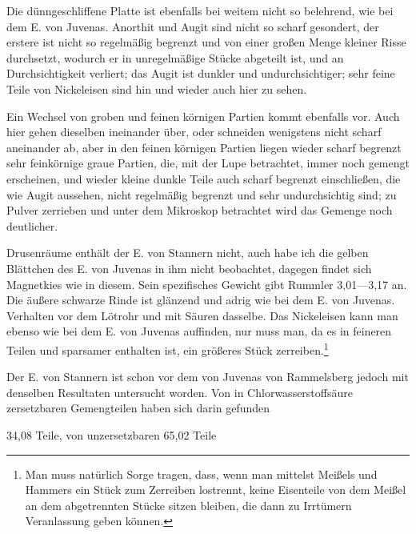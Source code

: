 \documentclass[a4paper, 11pt, oneside]{article}
\begin{document}
Die dünngeschliffene Platte ist ebenfalls bei weitem nicht so belehrend, wie bei dem E. von Juvenas. Anorthit und Augit sind nicht so scharf gesondert, der erstere ist nicht so regelmäßig begrenzt und von einer großen Menge kleiner Risse durchsetzt, wodurch er in unregelmäßige Stücke abgeteilt ist, und an Durchsichtigkeit verliert; das Augit ist dunkler und undurchsichtiger; sehr feine Teile von Nickeleisen sind hin und wieder auch hier zu sehen.

Ein Wechsel von groben und feinen körnigen Partien kommt ebenfalls vor. Auch hier gehen dieselben ineinander über, oder schneiden wenigstens nicht scharf aneinander ab, aber in den feinen körnigen Partien liegen wieder scharf begrenzt sehr feinkörnige graue Partien, die, mit der Lupe betrachtet, immer noch gemengt erscheinen, und wieder kleine dunkle Teile auch scharf begrenzt einschließen, die wie Augit aussehen, nicht regelmäßig begrenzt und sehr undurchsichtig sind; zu Pulver zerrieben und unter dem Mikroskop betrachtet wird das Gemenge noch deutlicher.

Drusenräume enthält der E. von Stannern nicht, auch habe ich die gelben Blättchen des E. von Juvenas in ihm nicht beobachtet, dagegen findet sich Magnetkies wie in diesem. Sein spezifisches Gewicht gibt Rummler 3,01—3,17 an. Die äußere schwarze Rinde ist glänzend und adrig wie bei dem E. von Juvenas. Verhalten vor dem Lötrohr und mit Säuren dasselbe. Das Nickeleisen kann man ebenso wie bei dem E. von Juvenas auffinden, nur muss man, da es in feineren Teilen und sparsamer enthalten ist, ein größeres Stück zerreiben.\footnote{Man muss natürlich Sorge tragen, dass, wenn man mittelst Meißels und Hammers ein Stück zum Zerreiben lostrennt, keine Eisenteile von dem Meißel an dem abgetrennten Stücke sitzen bleiben, die dann zu Irrtümern Veranlassung geben können.}

Der E. von Stannern ist schon vor dem von Juvenas von Rammelsberg jedoch mit denselben Resultaten untersucht worden. Von in Chlorwasserstoffsäure zersetzbaren Gemengteilen haben sich darin gefunden

34,08 Teile,  
von unzersetzbaren 65,02 Teile  
\end{document}
